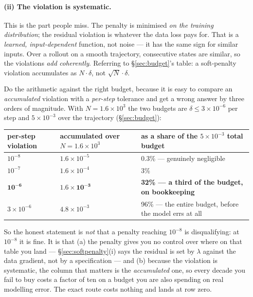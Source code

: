 \paragraph{(ii) The violation is systematic.} This is the part people miss. The
penalty is minimised \emph{on the training distribution}; the residual violation
is whatever the data loss pays for. That is a \emph{learned, input-dependent}
function, not noise --- it has the same sign for similar inputs. Over a rollout
on a smooth trajectory, consecutive states are similar, so the violations
\emph{add coherently}. Referring to \S\ref{sec:budget}'s table: a soft-penalty
violation accumulates as $N\cdot\delta$, not $\sqrt N\cdot\delta$.

Do the arithmetic against the right budget, because it is easy to compare an
\emph{accumulated} violation with a \emph{per-step} tolerance and get a wrong
answer by three orders of magnitude. With $N = 1.6\times10^{3}$ the two budgets
are $\delta \le 3\times10^{-6}$ per step and $5\times10^{-3}$ over the
trajectory (\S\ref{sec:budget}):

\begin{center}
\begin{tabularx}{\textwidth}{@{}L{3.0cm} L{4.2cm} Y@{}}
\toprule
\textbf{per-step violation} & \textbf{accumulated over
  $N = 1.6\times10^{3}$} & \textbf{as a share of the $5\times10^{-3}$ total
  budget} \\
\midrule
$10^{-8}$ & $1.6\times10^{-5}$ & 0.3\% --- genuinely negligible \\
$10^{-7}$ & $1.6\times10^{-4}$ & 3\% \\
$\mathbf{10^{-6}}$ & $\mathbf{1.6\times10^{-3}}$ &
  \textbf{32\% --- a third of the budget, on bookkeeping} \\
$3\times10^{-6}$ & $4.8\times10^{-3}$ &
  96\% --- the entire budget, before the model errs at all \\
\bottomrule
\end{tabularx}
\end{center}

So the honest statement is \emph{not} that a penalty reaching $10^{-8}$ is
disqualifying: at $10^{-8}$ it is fine. It is that (a) the penalty gives you no
control over where on that table you land --- \S\ref{sec:softpenalty}(i) says
the residual is set by $\lambda$ against the data gradient, not by a
specification --- and (b) because the violation is systematic, the column that
matters is the \emph{accumulated} one, so every decade you fail to buy costs a
factor of ten on a budget you are also spending on real modelling error. The
exact route costs nothing and lands at row zero.

